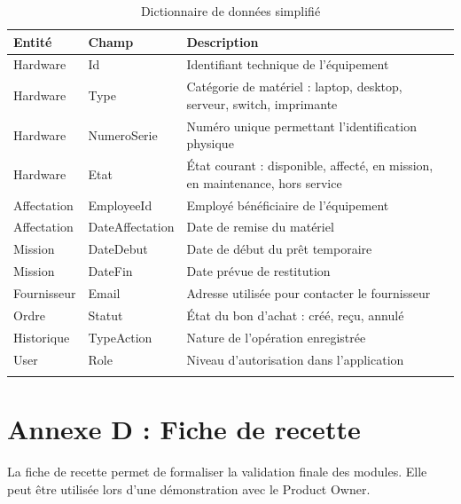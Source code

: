 \begin{longtable}{|m{3cm}|m{4.5cm}|m{6cm}|}
\hline
\textbf{Entité} & \textbf{Champ} & \textbf{Description} \\
\hline
\endhead
\endfoot
\endlastfoot
\hline
Hardware & Id & Identifiant technique de l'équipement \\
\hline
Hardware & Type & Catégorie de matériel : laptop, desktop, serveur, switch, imprimante \\
\hline
Hardware & NumeroSerie & Numéro unique permettant l'identification physique \\
\hline
Hardware & Etat & État courant : disponible, affecté, en mission, en maintenance, hors service \\
\hline
Affectation & EmployeeId & Employé bénéficiaire de l'équipement \\
\hline
Affectation & DateAffectation & Date de remise du matériel \\
\hline
Mission & DateDebut & Date de début du prêt temporaire \\
\hline
Mission & DateFin & Date prévue de restitution \\
\hline
Fournisseur & Email & Adresse utilisée pour contacter le fournisseur \\
\hline
Ordre & Statut & État du bon d'achat : créé, reçu, annulé \\
\hline
Historique & TypeAction & Nature de l'opération enregistrée \\
\hline
User & Role & Niveau d'autorisation dans l'application \\
\hline
\captionsetup{justification=centering,margin=1cm}
\caption{Dictionnaire de données simplifié}
\end{longtable}

\section*{Annexe D : Fiche de recette}

La fiche de recette permet de formaliser la validation finale des modules. Elle peut être utilisée lors d'une démonstration avec le Product Owner.

